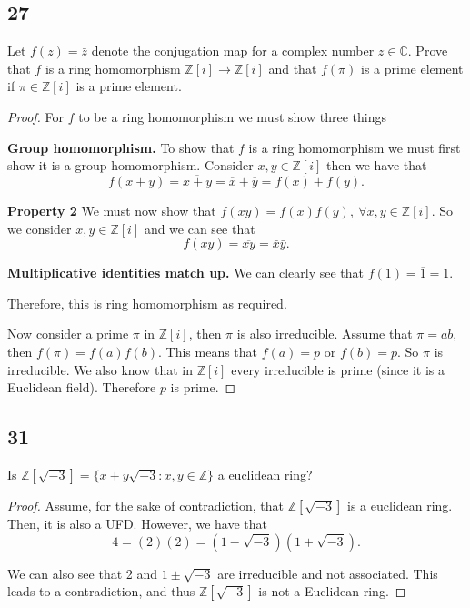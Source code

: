\documentclass{article}
\newcommand{\Z}{\mathbb{Z}}
\newcommand{\C}{\mathbb{C}}
\newenvironment{hwproof}[1]
{
    #1
    \begin{proof}
}{
    \end{proof}
}
\begin{document}
\subsection*{27}
\begin{hwproof}
    {
        Let $f(z) = \bar{z}$ denote the conjugation map for a complex number
        $z \in \C$. Prove that $f$ is a ring homomorphism $\Z[i] \to \Z[i]$
        and that $f(\pi)$ is a prime element if $\pi \in \Z[i]$ is a prime
        element.
    }
    For $f$ to be a ring homomorphism we must show three things

    \textbf{Group homomorphism.}
    To show that $f$ is a ring homomorphism we must first show it is a group
    homomorphism. Consider $x, y \in \Z[i]$ then we have that
    \begin{equation*}
        f(x + y) = \overline{x + y} = \overline{x} + \overline{y} = f(x) + f(y).
    \end{equation*}

    \textbf{Property 2}
    We must now show that $f(xy) = f(x)f(y), \ \forall x,y \in \Z[i]$. So
    we consider $x, y \in \Z[i]$ and we can see that
    \begin{equation*}
        f(xy) = \overline{xy} = \bar{x}\bar{y}.
    \end{equation*}

    \textbf{Multiplicative identities match up.}
    We can clearly see that $f(1) = \overline{1} = 1$.

    Therefore, this is ring homomorphism as required.
    
    Now consider a prime $\pi$ in $\Z[i]$, then $\pi$ is also irreducible.
    Assume that $\pi = ab$, then $f(\pi) = f(a)f(b)$. This means that
    $f(a) = p$ or $f(b) = p$. So $\pi$ is irreducible.
    We also know that in $\Z[i]$ every irreducible is prime (since it is a
    Euclidean field). Therefore $p$ is prime.

\end{hwproof}

\subsection*{31}
\begin{hwproof}
    {
        Is $\Z[\sqrt{-3}] = \{x + y\sqrt{-3}: x,y \in \Z\}$ a euclidean ring?
    }
    Assume, for the sake of contradiction, that $\Z[\sqrt{-3}]$ is a euclidean
    ring. Then, it is also a UFD. However, we have that
    \begin{equation*}
        4 = (2)(2) = (1 - \sqrt{-3})(1 + \sqrt{-3}).
    \end{equation*}

    We can also see that 2 and $1 \pm \sqrt{-3}$ are irreducible and not
    associated. This leads to a contradiction, and thus $\Z[\sqrt{-3}]$ is
    not a Euclidean ring.
\end{hwproof}
\end{document}
